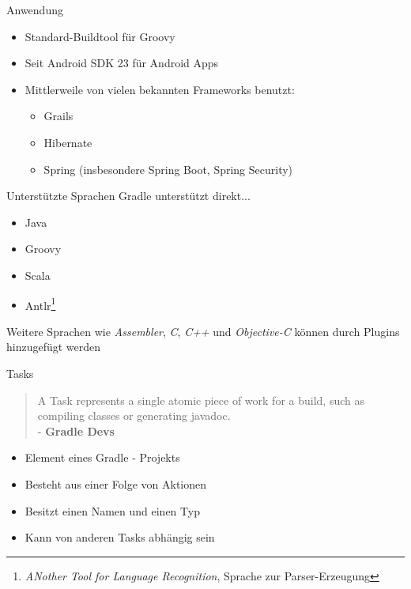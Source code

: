 \documentclass[newPxFont,numfooter,sectionpages,notes]{beamer}
\begin{document}
\begin{frame}{Anwendung}
\begin{itemize}
	\item Standard-Buildtool für Groovy
	\item Seit Android SDK 23 für Android Apps
	\item Mittlerweile von vielen bekannten Frameworks benutzt:
	\begin{itemize}
		\item Grails
		\item Hibernate
		\item Spring (insbesondere Spring Boot, Spring Security)
	\end{itemize}
\end{itemize}


\end{frame}

\begin{frame}{Unterstützte Sprachen}
Gradle unterstützt direkt...
\begin{itemize}
	\item Java
	\item Groovy
	\item Scala
	\item Antlr\footnote{\emph{ANother Tool for Language Recognition}, Sprache zur Parser-Erzeugung}
\end{itemize}
Weitere Sprachen wie \emph{Assembler}, \emph{C}, \emph{C++} und \emph{Objective-C} können durch Plugins hinzugefügt werden
\end{frame}

\begin{frame}{Tasks}
\vfill
\begin{quotation}
	A Task represents a single atomic piece of work for a build, such as compiling classes or generating javadoc. \\ - \centering \textbf{Gradle Devs}
\end{quotation}
\pause

\begin{itemize}
	\item Element eines Gradle - Projekts
	\item Besteht aus einer Folge von Aktionen
	\item Besitzt einen Namen und einen Typ
	\item Kann von anderen Tasks abhängig sein
\end{itemize}
\end{frame}
\end{document}
